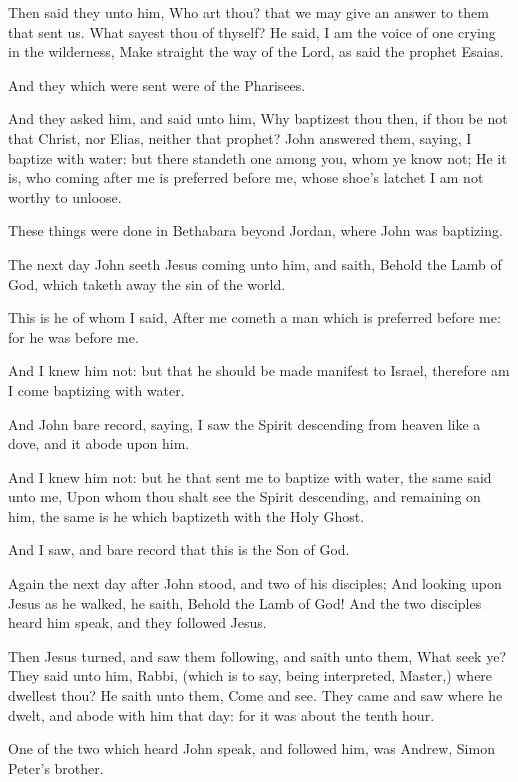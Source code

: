 \Verse Then said they unto him, Who art thou? that we may give an answer to them that sent us. What sayest thou of thyself?  \Verse He said, I am the voice of one crying in the wilderness, Make straight the way of the Lord, as said the prophet Esaias.

\Verse And they which were sent were of the Pharisees.

\Verse And they asked him, and said unto him, Why baptizest thou then, if thou be not that Christ, nor Elias, neither that prophet?  \Verse John answered them, saying, I baptize with water: but there standeth one among you, whom ye know not; \Verse He it is, who coming after me is preferred before me, whose shoe's latchet I am not worthy to unloose.

\Verse These things were done in Bethabara beyond Jordan, where John was baptizing.

\Verse The next day John seeth Jesus coming unto him, and saith, Behold the Lamb of God, which taketh away the sin of the world.

\Verse This is he of whom I said, After me cometh a man which is preferred before me: for he was before me.

\Verse And I knew him not: but that he should be made manifest to Israel, therefore am I come baptizing with water.

\Verse And John bare record, saying, I saw the Spirit descending from heaven like a dove, and it abode upon him.

\Verse And I knew him not: but he that sent me to baptize with water, the same said unto me, Upon whom thou shalt see the Spirit descending, and remaining on him, the same is he which baptizeth with the Holy Ghost.

\Verse And I saw, and bare record that this is the Son of God.

\Verse Again the next day after John stood, and two of his disciples; \Verse And looking upon Jesus as he walked, he saith, Behold the Lamb of God!  \Verse And the two disciples heard him speak, and they followed Jesus.

\Verse Then Jesus turned, and saw them following, and saith unto them, What seek ye? They said unto him, Rabbi, (which is to say, being interpreted, Master,) where dwellest thou?  \Verse He saith unto them, Come and see. They came and saw where he dwelt, and abode with him that day: for it was about the tenth hour.

\Verse One of the two which heard John speak, and followed him, was Andrew, Simon Peter's brother.

